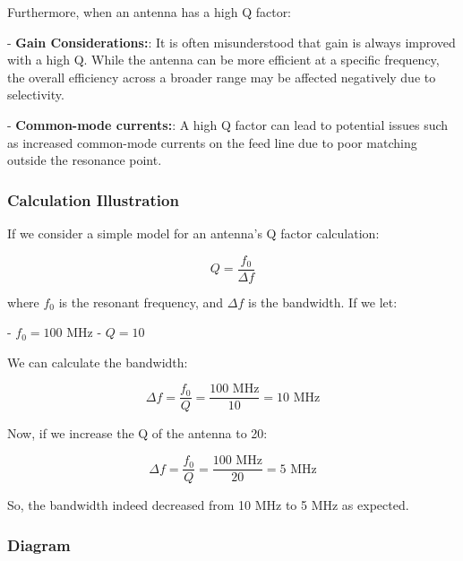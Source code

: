 Furthermore, when an antenna has a high Q factor:

- \textbf{Gain Considerations:}: It is often misunderstood that gain is always improved with a high Q. While the antenna can be more efficient at a specific frequency, the overall efficiency across a broader range may be affected negatively due to selectivity.
  
- \textbf{Common-mode currents:}: A high Q factor can lead to potential issues such as increased common-mode currents on the feed line due to poor matching outside the resonance point.

\subsubsection{Calculation Illustration}

If we consider a simple model for an antenna's Q factor calculation:

\[
Q = \frac{f_0}{\Delta f}
\]

where \( f_0 \) is the resonant frequency, and \( \Delta f \) is the bandwidth. If we let:

- \( f_0 = 100 \text{ MHz} \)
- \( Q = 10 \)

We can calculate the bandwidth:

\[
\Delta f = \frac{f_0}{Q} = \frac{100 \text{ MHz}}{10} = 10 \text{ MHz}
\]

Now, if we increase the Q of the antenna to 20:

\[
\Delta f = \frac{f_0}{Q} = \frac{100 \text{ MHz}}{20} = 5 \text{ MHz}
\]

So, the bandwidth indeed decreased from 10 MHz to 5 MHz as expected.

\subsubsection{Diagram}

\begin{center}
\end{center}
